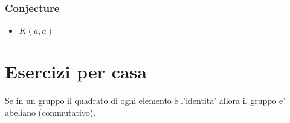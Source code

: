 \documentclass[12pt, a4paper]{report}
\begin{document}
\subsubsection{Conjecture}
\begin{itemize}
    \item $K(a,a) $
\end{itemize}

\section{Esercizi per casa}
Se in un gruppo il quadrato di ogni elemento è l'identita' allora il gruppo 
e' abeliano (commutativo).
\end{document}
